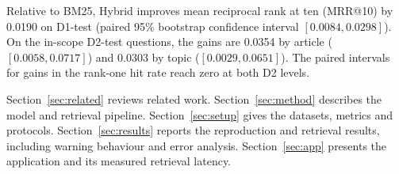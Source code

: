 Relative to BM25, Hybrid improves mean reciprocal rank at ten (MRR@10)
by 0.0190 on D1-test (paired 95\% bootstrap confidence interval
$[0.0084, 0.0298]$).
On the in-scope D2-test questions, the gains are 0.0354 by article
($[0.0058, 0.0717]$) and 0.0303 by topic ($[0.0029, 0.0651]$).
The paired intervals for gains in the rank-one hit rate reach zero at both
D2 levels.

Section~\ref{sec:related} reviews related work. Section~\ref{sec:method}
describes the model and retrieval pipeline. Section~\ref{sec:setup} gives the
datasets, metrics and protocols. Section~\ref{sec:results} reports the
reproduction and retrieval results, including warning behaviour and error
analysis. Section~\ref{sec:app} presents the application and its measured
retrieval latency.
